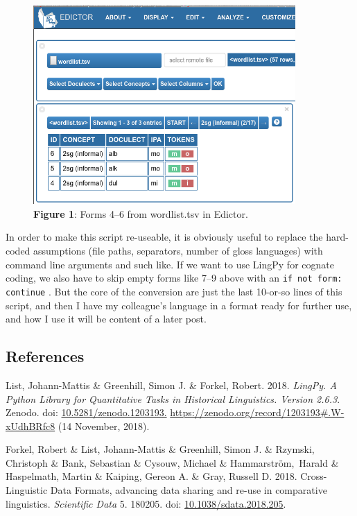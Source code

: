 \documentclass[
  a4paper,
  14pt,
  oneside,
  tablecaptionabove
]{scrbook}
\begin{document}
\begin{figure}[h]
\centering
\includegraphics[width=10cm]{images/alorese.png}
\caption*{\small \textbf{Figure 1}: Forms 4--6 from wordlist.tsv in Edictor.}
\end{figure}

In order to make this script re-useable, it is obviously useful to
replace the hard-coded assumptions (file paths, separators, number of
gloss languages) with command line arguments and such like. If we want
to use LingPy for cognate coding, we also have to skip empty forms like
7--9 above with an \lstinline!if not form: continue! . But the core of
the conversion are just the last 10-or-so lines of this script, and then
I have my colleague's language in a format ready for further use, and
how I use it will be content of a later post.


\subsection*{References}

\nopagebreak\hangindent=0.7cm {\small List, Johann-Mattis \& Greenhill, Simon J. \& Forkel, Robert. 2018.
\emph{LingPy. A Python Library for Quantitative Tasks in Historical
Linguistics. Version 2.6.3}.  Zenodo. doi:
\href{https://doi.org/10.5281/zenodo.1203193.}{10.5281/zenodo.1203193.}
\url{https://zenodo.org/record/1203193\#.W-xUdhBRfc8} (14 November,
2018). }

\nopagebreak\hangindent=0.7cm {\small Forkel, Robert \& List, Johann-Mattis \& Greenhill, Simon J. \&
Rzymski, Christoph \& Bank, Sebastian \& Cysouw, Michael \&
Hammarström,~Harald \& Haspelmath, Martin \& Kaiping, Gereon A. \& Gray,
Russell D. 2018. Cross-Linguistic Data Formats, advancing data sharing
and re-use in comparative linguistics. \emph{Scientific Data} 5. 180205.
doi:
\href{https://doi.org/10.1038/sdata.2018.205}{10.1038/sdata.2018.205}. 
}
\end{document}
